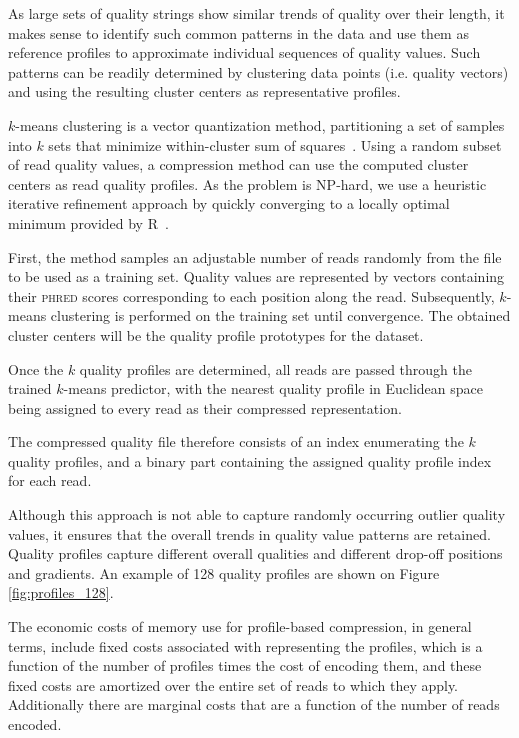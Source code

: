 \documentclass{bioinfo}
\begin{document}
\begin{methods}
As large sets of quality strings show similar trends of quality over
their length, it makes sense to identify such common patterns in the
data and use them as reference profiles to approximate individual
sequences of quality values. Such patterns can be readily determined
by clustering data points (i.e. quality vectors) and using the
resulting cluster centers as representative profiles.

$k$-means clustering is a vector quantization method, partitioning a
set of samples into $k$ sets that minimize within-cluster sum of
squares~\citep{macqueen1967some}. Using a random subset of read
quality values, a compression method can use the computed cluster
centers as read quality profiles. As the problem is NP-hard, we use a
heuristic iterative refinement approach by quickly converging to a
locally optimal minimum provided by R~\citep{hartigan1979algorithm}.

First, the method samples an adjustable number of reads randomly from
the file to be used as a training set. Quality values are represented
by vectors containing their \textsc{phred} scores corresponding to
each position along the read. Subsequently, $k$-means clustering is
performed on the training set until convergence. The obtained cluster
centers will be the quality profile prototypes for the dataset.

Once the $k$ quality profiles are determined, all reads are passed
through the trained $k$-means predictor, with the nearest quality
profile in Euclidean space being assigned to every read as their
compressed representation.

The compressed quality file therefore consists of an index enumerating
the $k$ quality profiles, and a binary part containing the assigned
quality profile index for each read.

Although this approach is not able to capture randomly occurring
outlier quality values, it ensures that the overall trends in quality
value patterns are retained. Quality profiles capture different
overall qualities and different drop-off positions and gradients. An
example of 128 quality profiles are shown on Figure
\ref{fig:profiles_128}.

The economic costs of memory use for profile-based compression, in
general terms, include fixed costs associated with representing the
profiles, which is a function of the number of profiles times the cost
of encoding them, and these fixed costs are amortized over the entire
set of reads to which they apply. Additionally there are marginal
costs that are a function of the number of reads encoded.


\end{methods}
\end{document}
